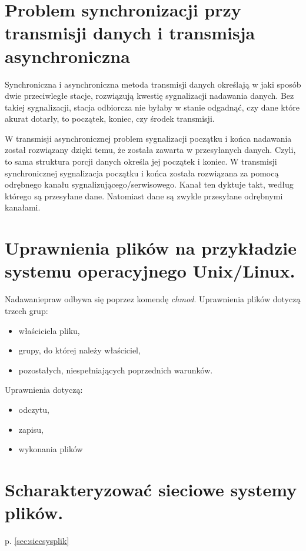 \documentclass[12pt,a4paper]{article}
\begin{document}
	\section{Problem synchronizacji przy transmisji danych i transmisja asynchroniczna}
	Synchroniczna i asynchroniczna metoda transmisji danych określają w jaki sposób dwie przeciwległe stacje, rozwiązują kwestię sygnalizacji nadawania danych. Bez takiej sygnalizacji, stacja odbiorcza nie byłaby w stanie odgadnąć, czy dane które akurat dotarły, to początek, koniec, czy środek transmisji.

	W transmisji asynchronicznej problem sygnalizacji początku i końca nadawania został rozwiązany dzięki temu, że została zawarta w przesyłanych danych. Czyli, to sama struktura porcji danych określa jej początek i koniec.
	W transmisji synchronicznej sygnalizacja początku i końca została rozwiązana za pomocą odrębnego kanału sygnalizującego/serwisowego. Kanał ten dyktuje takt, według którego są przesyłane dane. Natomiast dane są zwykle przesyłane odrębnymi kanałami.

	\section{Uprawnienia plików na przykładzie systemu operacyjnego Unix/Linux.}
	Nadawaniepraw odbywa się poprzez komendę \textit{chmod}. Uprawnienia plików dotyczą trzech grup:
	\begin{itemize}
		\item właściciela pliku,
		\item grupy, do której należy właściciel,
		\item pozostałych, niespełniających poprzednich warunków.
	\end{itemize}
	
	Uprawnienia dotyczą:
	\begin{itemize}
		\item odczytu,
		\item zapisu,
		\item wykonania plików
	\end{itemize}

	\section{Scharakteryzować sieciowe systemy plików.}
	p. \ref{sec:siecsysplik}
\end{document}
